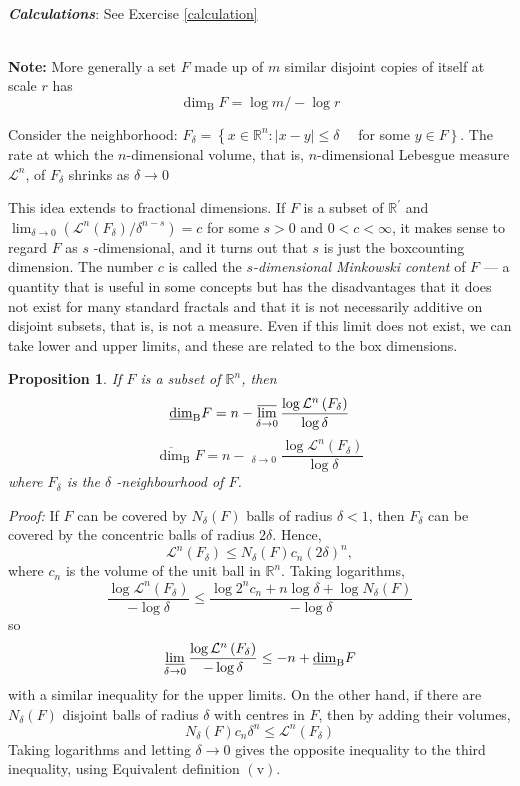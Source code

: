 \documentclass[12pt, a4paper]{article}
\DeclareMathOperator*\lowlim{\underline{lim}}
\newtheorem{proposition}{Proposition}[subsection]
\begin{document}
\textbf{\textit{\\Calculations}}: See Exercise \ref{calculation}

\textbf{\\Note: }More generally a set $F$ made up of $m$ similar disjoint copies of itself at scale $r$ has $$\operatorname{dim}_{\mathrm{B}} F=\log m /-\log r$$

Consider the neighborhood: $F_{\delta}=\left\{x \in \mathbb{R}^{n}:|x-y| \leq \delta \quad\right.$ for some $\left.y \in F\right\}$. The rate at which the $n$-dimensional volume, that is, $n$-dimensional Lebesgue measure $\mathcal{L}^n$, of $F_\delta$ shrinks as $\delta\rightarrow 0$

This idea extends to fractional dimensions. If $F$ is a subset of $\mathbb{R}^{\prime}$ and $\displaystyle\lim _{\delta \rightarrow 0}\left(\mathcal{L}^{n}\left(F_{\delta}\right) / \delta^{n-s}\right)=c$ for some $s>0$ and $0<c<\infty$, it makes sense to
regard $F$ as $s$ -dimensional, and it turns out that $s$ is just the boxcounting dimension. The number $c$ is called the \textit{$s$-dimensional Minkowski content} of $F$ --- a quantity that is useful in some concepts but has the disadvantages that it does not exist for many standard fractals and that it is not necessarily additive on disjoint subsets, that is, is not a measure. Even if this limit does not exist, we can take lower and upper limits, and these are related to the box dimensions.


\begin{proposition}
    If $F$ is a subset of $\mathbb{R}^{n}$, then
$$
\underline{\operatorname{dim}}_{\mathrm{B}} F=n-\varlimsup_{\delta \rightarrow 0} \frac{\log \mathcal{L}^{n}\left(F_{\delta}\right)}{\log \delta}
$$
$$
\overline{\operatorname{dim}}_{\mathrm{B}} F=n-\lowlim_{\delta \rightarrow 0} \frac{\log \mathcal{L}^{n}\left(F_{\delta}\right)}{\log \delta}
$$
where $F_{\delta}$ is the $\delta$ -neighbourhood of $F$. 
\end{proposition}
\textit{Proof: }
If $F$ can be covered by $N_{\delta}(F)$ balls of radius $\delta<1$, then $F_{\delta}$ can be covered by the concentric balls of radius $2 \delta .$ Hence,
$$
\mathcal{L}^{n}\left(F_{\delta}\right) \leq N_{\delta}(F) c_{n}(2 \delta)^{n},
$$
where $c_{n}$ is the volume of the unit ball in $\mathbb{R}^{n} .$ Taking logarithms,
$$
\frac{\log \mathcal{L}^{n}\left(F_{\delta}\right)}{-\log \delta} \leq \frac{\log 2^{n} c_{n}+n \log \delta+\log N_{\delta}(F)}{-\log \delta}
$$
so
$$
\varliminf_{\delta \rightarrow 0} \frac{\log \mathcal{L}^{n}\left(F_{\delta}\right)}{-\log \delta} \leq -n+\underline{\operatorname{dim}}_{\mathrm{B}} F
$$
with a similar inequality for the upper limits. On the other hand, if there are $N_{\delta}(F)$ disjoint balls of radius $\delta$ with centres in $F$, then by adding their volumes,
$$
N_{\delta}(F) c_{n} \delta^{n} \leq \mathcal{L}^{n}\left(F_{\delta}\right)
$$
Taking logarithms and letting $\delta \rightarrow 0$ gives the opposite inequality to the third inequality, using Equivalent definition $(\mathrm{v})$.
\end{document}
